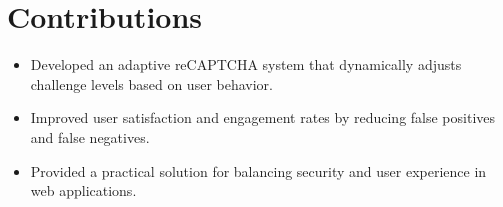 \documentclass{article}
\begin{document}
\section{Contributions}
\begin{itemize}
    \item Developed an adaptive reCAPTCHA system that dynamically adjusts challenge levels based on user behavior.
    \item Improved user satisfaction and engagement rates by reducing false positives and false negatives.
    \item Provided a practical solution for balancing security and user experience in web applications.
\end{itemize}



\end{document}
